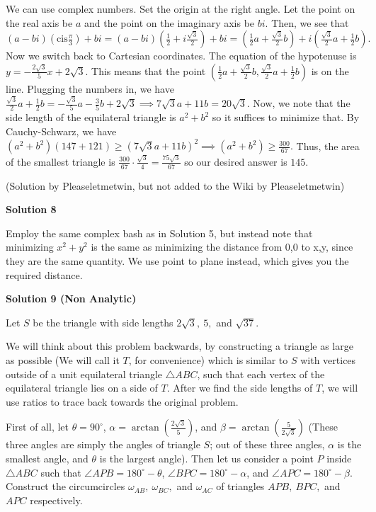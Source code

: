 \begin{enumerate}
We can use complex numbers. Set the origin at the right angle. Let the point on the real axis be $a$ and the point on the imaginary axis be $bi$. Then, we see that $(a-bi)\left(\text{cis}\frac{\pi}{3}\right)+bi=(a-bi)\left(\frac{1}{2}+i\frac{\sqrt{3}}{2}\right)+bi=\left(\frac{1}{2}a+\frac{\sqrt{3}}{2}b\right)+i\left(\frac{\sqrt{3}}{2}a+\frac{1}{2}b\right).$ Now we switch back to Cartesian coordinates. The equation of the hypotenuse is $y=-\frac{2\sqrt{3}}{5}x+2\sqrt{3}.$ This means that the point $\left(\frac{1}{2}a+\frac{\sqrt{3}}{2}b,\frac{\sqrt{3}}{2}a+\frac{1}{2}b\right)$ is on the line. Plugging the numbers in, we have $\frac{\sqrt{3}}{2}a+\frac{1}{2}b=-\frac{\sqrt{3}}{5}a-\frac{3}{5}b+2\sqrt{3} \implies 7\sqrt{3}a+11b=20\sqrt{3}.$ Now, we note that the side length of the equilateral triangle is $a^2+b^2$ so it suffices to minimize that. By Cauchy-Schwarz, we have $(a^2+b^2)(147+121)\geq(7\sqrt{3}a+11b)^2 \implies (a^2+b^2)\geq\frac{300}{67}.$ Thus, the area of the smallest triangle is $\frac{300}{67}\cdot\frac{\sqrt{3}}{4}=\frac{75\sqrt{3}}{67}$ so our desired answer is $\boxed{145}$.

 (Solution by Pleaseletmetwin, but not added to the Wiki by Pleaseletmetwin)

 



\textbf{Solution 8}

Employ the same complex bash as in Solution 5, but instead note that minimizing $x^2+y^2$ is the same as minimizing the distance from 0,0 to x,y, since they are the same quantity. We use point to plane instead, which gives you the required distance.

 



\textbf{Solution 9 (Non Analytic)}

Let $S$ be the triangle with side lengths $2\sqrt{3},~5,$ and $\sqrt{37}$.

 We will think about this problem backwards, by constructing a triangle as large as possible (We will call it $T$, for convenience) which is similar to $S$ with vertices outside of a unit equilateral triangle $\triangle ABC$, such that each vertex of the equilateral triangle lies on a side of $T$. After we find the side lengths of $T$, we will use ratios to trace back towards the original problem.

 First of all, let $\theta = 90^{\circ}$, $\alpha = \arctan\left(\frac{2\sqrt{3}}{5}\right)$, and $\beta = \arctan\left(\frac{5}{2\sqrt{3}}\right)$ (These three angles are simply the angles of triangle $S$; out of these three angles, $\alpha$ is the smallest angle, and $\theta$ is the largest angle). Then let us consider a point $P$ inside $\triangle ABC$ such that $\angle APB = 180^{\circ} - \theta$, $\angle BPC = 180^{\circ} - \alpha$, and $\angle APC = 180^{\circ} - \beta$. Construct the circumcircles $\omega_{AB}, ~\omega_{BC},$ and $\omega_{AC}$ of triangles $APB, ~BPC,$ and $APC$ respectively. 


\end{enumerate}
